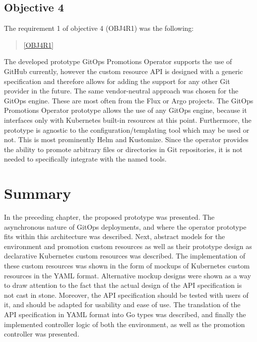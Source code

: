\subsection*{Objective 4}

The requirement 1 of objective 4 (OBJ4R1) was the following:

\begin{quotation}
	\noindent
	\ref{OBJ4R1}
\end{quotation}

The developed prototype GitOps Promotions Operator supports the use of GitHub currently,
however the custom resource API is designed with a generic specification and therefore allows
for adding the support for any other Git provider in the future.
The same vendor-neutral approach was chosen for the GitOps engine.
These are most often from the Flux or Argo projects.
The GitOps Promotions Operator prototype allows the use of any GitOps engine,
because it interfaces only with Kubernetes built-in resources at this point.
Furthermore, the prototype is agnostic to the configuration/templating tool which may be used or not.
This is most prominently Helm and Kustomize. Since the operator provides the ability
to promote arbitrary files or directories in Git repositories, it is not needed to specifically integrate
with the named tools.






\section{Summary}

In the preceding chapter,
the proposed prototype was presented.
The asynchronous nature of GitOps deployments, and where
the operator prototype fits within this architecture was described.
Next, abstract models for the environment and promotion custom resources as well as their prototype
design as declarative Kubernetes custom resources was described.
The implementation of these custom resources was shown in the form of mockups
of Kubernetes custom resources in the YAML format.
Alternative mockup designs were shown as a way to draw attention to the fact
that the actual design of the API specification is not cast in stone.
Moreover, the API specification should be tested with users of it,
and should be adapted for usability and ease of use.
The translation of the API specification in YAML format into Go types was described,
and finally the implemented controller logic of both the environment, as well as
the promotion controller was presented.

